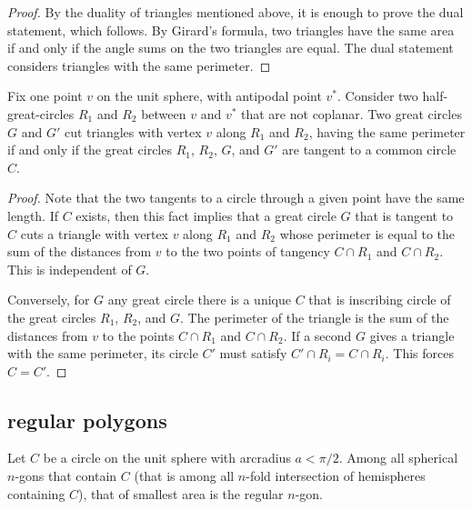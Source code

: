 \begin{proof}  By the duality of triangles mentioned above, it is enough to prove the dual statement, which follows.  By Girard's formula, two triangles have the same area if and only if the angle sums on the two triangles are equal.
The dual statement considers triangles with the same perimeter.
\end{proof}

\begin{lemma}  Fix one point $v$ on the unit sphere, with antipodal point $v^*$.  Consider two half-great-circles $R_1$ and $R_2$ between $v$ and $v^*$ that are not coplanar.  Two great circles $G$ and $G'$ cut triangles with vertex $v$ along $R_1$ and $R_2$, having the same perimeter if and only if the great circles $R_1$, $R_2$, $G$, and $G'$ are tangent to a common circle $C$.
\end{lemma}

\begin{proof} Note that the two tangents to a circle through a given point have the same length.  If $C$ exists, then this fact implies that a great circle $G$ that is tangent to $C$ cuts a triangle with vertex $v$ along $R_1$ and $R_2$ whose perimeter is equal to the sum of the distances from $v$ to the two points of tangency $C\cap R_1$ and $C\cap R_2$.  This is independent of $G$.

Conversely, for $G$ any great circle there is a unique $C$ that is inscribing circle of the great circles $R_1$, $R_2$, and $G$.  The perimeter of the triangle is the sum of the distances from $v$ to the points $C\cap R_1$ and $C\cap R_2$.
If a second $G$ gives a triangle with the same perimeter, its circle $C'$
must satisfy $C'\cap R_i = C\cap R_i$.  This forces $C=C'$.
\end{proof}

\subsection{regular polygons}

\begin{lemma}\label{lemma:ngon}
Let $C$ be a circle on the unit sphere with arcradius $a<\pi/2$.  Among all spherical $n$-gons that
contain $C$  (that is among all $n$-fold intersection of hemispheres containing $C$), that of smallest area is the regular $n$-gon.  
\end{lemma}

